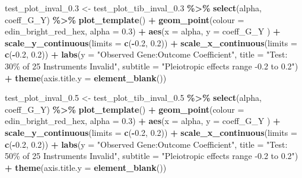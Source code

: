 \documentclass[
]{article}
\newenvironment{Shaded}{\begin{snugshade}}{\end{snugshade}}
\newcommand{\AttributeTok}[1]{\textcolor[rgb]{0.13,0.29,0.53}{#1}}
\newcommand{\FloatTok}[1]{\textcolor[rgb]{0.00,0.00,0.81}{#1}}
\newcommand{\FunctionTok}[1]{\textcolor[rgb]{0.13,0.29,0.53}{\textbf{#1}}}
\newcommand{\NormalTok}[1]{#1}
\newcommand{\OtherTok}[1]{\textcolor[rgb]{0.56,0.35,0.01}{#1}}
\newcommand{\SpecialCharTok}[1]{\textcolor[rgb]{0.81,0.36,0.00}{\textbf{#1}}}
\newcommand{\StringTok}[1]{\textcolor[rgb]{0.31,0.60,0.02}{#1}}
\begin{document}
\begin{Shaded}
\begin{Highlighting}[]
\NormalTok{ test\_plot\_inval\_0}\FloatTok{.3} \OtherTok{\textless{}{-}}\NormalTok{ test\_plot\_tib\_inval\_0}\FloatTok{.3} \SpecialCharTok{\%\textgreater{}\%}
   \FunctionTok{select}\NormalTok{(alpha, coeff\_G\_Y) }\SpecialCharTok{\%\textgreater{}\%}
   \FunctionTok{plot\_template}\NormalTok{() }\SpecialCharTok{+}
   \FunctionTok{geom\_point}\NormalTok{(}\AttributeTok{colour =}\NormalTok{ edin\_bright\_red\_hex, }\AttributeTok{alpha =} \FloatTok{0.3}\NormalTok{) }\SpecialCharTok{+}
   \FunctionTok{aes}\NormalTok{(}\AttributeTok{x =}\NormalTok{ alpha, }\AttributeTok{y =}\NormalTok{ coeff\_G\_Y ) }\SpecialCharTok{+}
   \FunctionTok{scale\_y\_continuous}\NormalTok{(}\AttributeTok{limits =} \FunctionTok{c}\NormalTok{(}\SpecialCharTok{{-}}\FloatTok{0.2}\NormalTok{, }\FloatTok{0.2}\NormalTok{)) }\SpecialCharTok{+}
   \FunctionTok{scale\_x\_continuous}\NormalTok{(}\AttributeTok{limits =} \FunctionTok{c}\NormalTok{(}\SpecialCharTok{{-}}\FloatTok{0.2}\NormalTok{, }\FloatTok{0.2}\NormalTok{)) }\SpecialCharTok{+}
   \FunctionTok{labs}\NormalTok{(}\AttributeTok{y =} \StringTok{"Observed Gene:Outcome Coefficient"}\NormalTok{,}
        \AttributeTok{title =} \StringTok{"Test: 30\% of 25 Instruments Invalid"}\NormalTok{,}
        \AttributeTok{subtitle =} \StringTok{"Pleiotropic effects range {-}0.2 to 0.2"}\NormalTok{) }\SpecialCharTok{+}
   \FunctionTok{theme}\NormalTok{(}\AttributeTok{axis.title.y =} \FunctionTok{element\_blank}\NormalTok{())}

\NormalTok{ test\_plot\_inval\_0}\FloatTok{.5} \OtherTok{\textless{}{-}}\NormalTok{ test\_plot\_tib\_inval\_0}\FloatTok{.5} \SpecialCharTok{\%\textgreater{}\%}
   \FunctionTok{select}\NormalTok{(alpha, coeff\_G\_Y) }\SpecialCharTok{\%\textgreater{}\%}
   \FunctionTok{plot\_template}\NormalTok{() }\SpecialCharTok{+}
   \FunctionTok{geom\_point}\NormalTok{(}\AttributeTok{colour =}\NormalTok{ edin\_bright\_red\_hex, }\AttributeTok{alpha =} \FloatTok{0.3}\NormalTok{) }\SpecialCharTok{+}
   \FunctionTok{aes}\NormalTok{(}\AttributeTok{x =}\NormalTok{ alpha, }\AttributeTok{y =}\NormalTok{ coeff\_G\_Y ) }\SpecialCharTok{+}
   \FunctionTok{scale\_y\_continuous}\NormalTok{(}\AttributeTok{limits =} \FunctionTok{c}\NormalTok{(}\SpecialCharTok{{-}}\FloatTok{0.2}\NormalTok{, }\FloatTok{0.2}\NormalTok{)) }\SpecialCharTok{+}
   \FunctionTok{scale\_x\_continuous}\NormalTok{(}\AttributeTok{limits =} \FunctionTok{c}\NormalTok{(}\SpecialCharTok{{-}}\FloatTok{0.2}\NormalTok{, }\FloatTok{0.2}\NormalTok{)) }\SpecialCharTok{+}
   \FunctionTok{labs}\NormalTok{(}\AttributeTok{y =} \StringTok{"Observed Gene:Outcome Coefficient"}\NormalTok{,}
        \AttributeTok{title =} \StringTok{"Test: 50\% of 25 Instruments Invalid"}\NormalTok{,}
        \AttributeTok{subtitle =} \StringTok{"Pleiotropic effects range {-}0.2 to 0.2"}\NormalTok{) }\SpecialCharTok{+}
   \FunctionTok{theme}\NormalTok{(}\AttributeTok{axis.title.y =} \FunctionTok{element\_blank}\NormalTok{())}


\end{Highlighting}
\end{Shaded}
\end{document}
